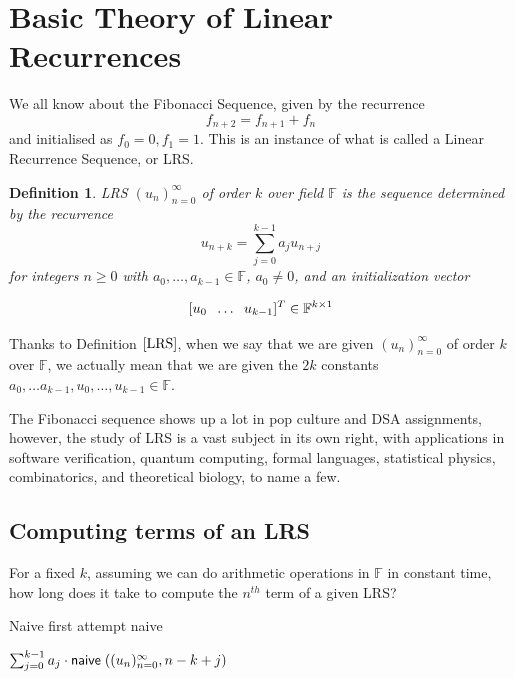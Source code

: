 \documentclass{article}
\theoremstyle{definition}
\newtheorem{definition}{Definition}[section]
\begin{document}
\section{Basic Theory of Linear Recurrences}

We all know about the Fibonacci Sequence, given by the recurrence
$$ f_{n+2} = f_{n+1} + f_{n}$$
and initialised as $f_0 = 0, f_1 = 1$. This is an instance of what is called a Linear Recurrence Sequence, or LRS.

\begin{definition}
\label{LRS}
\emph{LRS $(u_n)_{n=0}^{\infty}$ of order $k$ over field $\mathbb{F} $ is the sequence determined by the recurrence}
\begin{equation}
    u_{n+k} = \sum_{j=0}^{k-1} a_j u_{n+j}
\label{eq:fibonacci sequence}
\end{equation} 
\emph{for integers $n \geq 0$ with $a_0,\dots ,a_{k-1} \in \mathbb{F}$, $a_0 \neq 0$, and an initialization vector}

$$ [u_0\hspace{2mm}\dots \hspace{2mm}u_{k-1}]^T \in \mathbb{F}^{k\times1} $$

Thanks to Definition $\ref{LRS}$, when we say that we are given $(u_n)_{n=0}^{\infty}$ of order $k$ over $\mathbb{F}$, we actually
mean that we are given the $2k$ constants $a_0,\dots a_{k-1},u_0,\dots ,u_{k-1} \in \mathbb{F}$.
\end{definition}

The Fibonacci sequence shows up a lot in pop culture and DSA assignments, however, the study of LRS is a vast subject in its own right, with applications in software verification, quantum computing, formal languages, statistical physics, combinatorics, and theoretical biology, to name a few.

\subsection{Computing terms of an LRS}

For a fixed $k$, assuming we can do arithmetic operations in $\mathbb{F}$ in constant time, how long does it take to compute the $n^{th}$ term of a given LRS?

\begin{algorithm}
\caption{Naive first attempt naive}\label{alg:one}
\BlankLine
{}
\Return $\sum_{j=0}^{k-1}a_j \cdot \mathsf{naive} \hspace{1mm} ((u_n)_{n=0}^{\infty},n-k+j)$
\end{algorithm}
\end{document}
